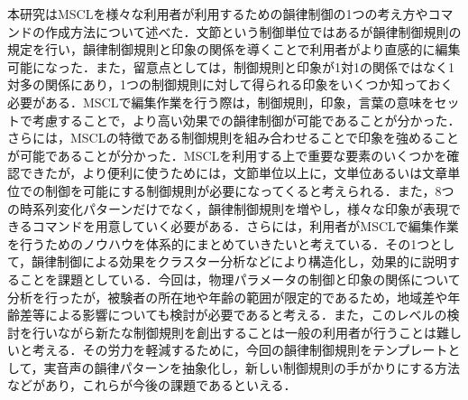 \documentclass[japanese]{jnlp_1.4}
\begin{document}
本研究はMSCLを様々な利用者が利用するための韻律制御の1つの考え方やコマンドの作成方法について述べた．文節という制御単位ではあるが韻律制御規則の規定を行い，韻律制御規則と印象の関係を導くことで利用者がより直感的に編集可能になった．また，留意点としては，制御規則と印象が1対1の関係ではなく1対多の関係にあり，1つの制御規則に対して得られる印象をいくつか知っておく必要がある．MSCLで編集作業を行う際は，制御規則，印象，言葉の意味をセットで考慮することで，より高い効果での韻律制御が可能であることが分かった．さらには，MSCLの特徴である制御規則を組み合わせることで印象を強めることが可能であることが分かった．MSCLを利用する上で重要な要素のいくつかを確認できたが，より便利に使うためには，文節単位以上に，文単位あるいは文章単位での制御を可能にする制御規則が必要になってくると考えられる．また，8つの時系列変化パターンだけでなく，韻律制御規則を増やし，様々な印象が表現できるコマンドを用意していく必要がある．さらには，利用者がMSCLで編集作業を行うためのノウハウを体系的にまとめていきたいと考えている．その1つとして，韻律制御による効果をクラスター分析などにより構造化し，効果的に説明することを課題としている．今回は，物理パラメータの制御と印象の関係について分析を行ったが，被験者の所在地や年齢の範囲が限定的であるため，地域差や年齢差等による影響についても検討が必要であると考える．また，このレベルの検討を行いながら新たな制御規則を創出することは一般の利用者が行うことは難しいと考える．その労力を軽減するために，今回の韻律制御規則をテンプレートとして，実音声の韻律パターンを抽象化し，新しい制御規則の手がかりにする方法などがあり，これらが今後の課題であるといえる．
\end{document}
